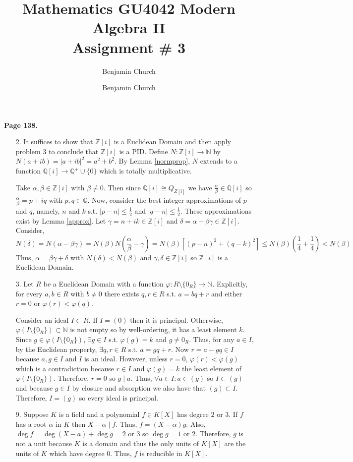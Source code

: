 \documentclass[12pt]{extarticle}
\author{Benjamin Church }
\newcommand{\divides}{\mid}
\newcommand{\Z}{\mathbb{Z}}
\newcommand{\N}{\mathbb{N}}
\newcommand{\Q}{\mathbb{Q}}
\newcommand{\sm}{\! \setminus \!}
\newcommand{\atitle}[1]{\title{%
	\large \textbf{Mathematics GU4042 Modern Algebra II
	\\ Assignment \# #1} \vspace{-2ex}}
\author{Benjamin Church }
\maketitle}
\begin{document}
\atitle{3}
\textbf{Page 138.} 
\begin{enumerate}
\item[2.] It suffices to show that $\Z[i]$ is a Euclidean Domain and then apply problem 3 to conclude that $\Z[i]$ is a PID. Define $N : \Z[i] \rightarrow \N$ by $N(a + ib) = |a+ib|^2 = a^2 + b^2$. By Lemma \ref{normprop}, $N$ extends to a function $\Q[i] \rightarrow \Q^+ \cup \{0 \}$ which is totally multiplicative.  


Take $\alpha, \beta \in \Z[i]$ with $\beta \neq 0$. Then since $\Q[i] \cong Q_{Z[i]}$ we have $\frac{\alpha}{\beta} \in \Q[i]$ so $\frac{\alpha}{\beta} = p + iq$ with $p, q \in \Q$. Now, consider the best integer approximations of $p$ and $q$, namely, $n$ and $k$ s.t. $|p - n| \le \frac{1}{2}$ and $|q - n| \le \frac{1}{2}$. These approximations exist by Lemma \ref{approx}. Let $\gamma = n + ik \in \Z[i]$ and $\delta = \alpha - \beta \gamma \in \Z[i]$. Consider,
\[N\left(\delta \right) = N(\alpha - \beta \gamma) = N(\beta) N\left(\frac{\alpha}{\beta} - \gamma \right) = N(\beta) \left[(p - n)^2 + (q - k)^2 \right] \le N(\beta) \left(\frac{1}{4} + \frac{1}{4} \right) < N(\beta) \] 
Thus, $\alpha = \beta \gamma + \delta$ with $N(\delta) < N(\beta)$ and $\gamma, \delta \in \Z[i]$ so $\Z[i]$ is a Euclidean Domain.

\item[3.] Let $R$ be a Euclidean Domain with a function $\varphi : R \sm \{0_R\} \rightarrow \N$. Explicitly, for every $a, b \in R$ with $b \neq 0$ there exists $q, r \in R$ s.t. $a = bq + r$ and either $r = 0$ or $\varphi(r) < \varphi(q)$. \smallskip

Consider an ideal $I \subset R$. If $I = (0)$ then it is principal. Otherwise, $\varphi(I \sm \{0_R\}) \subset \N$ is not empty so by well-ordering, it has a least element $k$. Since $g \in \varphi(I \sm \{0_R\})$, $\exists g \in I$ s.t. $\varphi(g) = k$ and $g \neq 0_R$. Thus, for any $a \in I$, by the Euclidean property, $\exists q, r \in R$ s.t. $a = gq + r$. Now $r = a - gq \in I$ because $a, g \in I$ and $I$ is an ideal. However, unless $r = 0$, $\varphi(r) < \varphi(g)$ which is a contradiction because $r \in I$ and $\varphi(g) = k$ the least element of $\varphi(I \sm \{0_R\})$. Therefore, $r = 0$ so $g \divides a$. Thus, $\forall a \in I : a \in (g)$ so $I \subset (g)$ and because $g \in I$ by closure and absorption we also have that $(g) \subset I$. Therefore, $I = (g)$ so every ideal is principal.  

\item[9.] Suppose $K$ is a field and a polynomial $f \in K[X]$ has degree $2$ or $3$.
If $f$ has a root $\alpha$ in $K$ then $X - \alpha \divides f$. Thus, $f = (X - \alpha) g$. Also, $\deg{f} = \deg{\left(X-a\right)} + \deg{g} = 2$ or $3$ so $\deg g = 1$ or $2$. Therefore, $g$ is not a unit because $K$ is a domain and thus the only units of $K[X]$ are the units of $K$ which have degree $0$. Thus, $f$ is reducible in $K[X]$. \smallskip


\end{enumerate}
\end{document}
